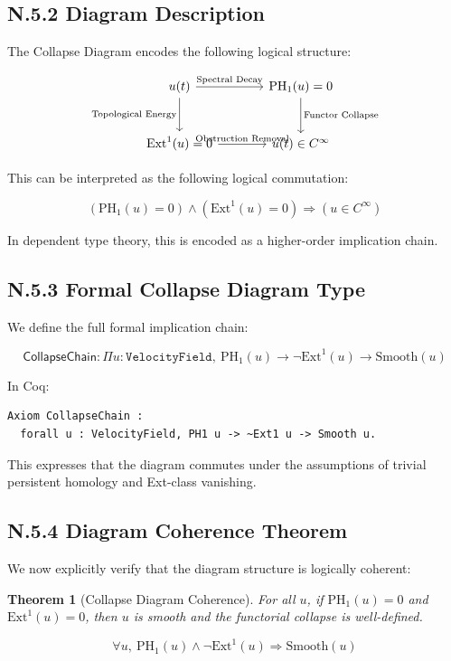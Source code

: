 \documentclass[11pt]{article}
\newtheorem{theorem}{Theorem}[section]
\begin{document}
\subsection*{N.5.2 Diagram Description}

The Collapse Diagram encodes the following logical structure:

\[
\begin{tikzcd}[row sep=large, column sep=large]
u(t) \arrow[r, "\text{Spectral Decay}"] \arrow[d, swap, "\text{Topological Energy}"]
& \mathrm{PH}_1(u) = 0 \arrow[d, "\text{Functor Collapse}"] \\
\mathrm{Ext}^1(u) = 0 \arrow[r, "\text{Obstruction Removal}"]
& u(t) \in C^\infty
\end{tikzcd}
\]

This can be interpreted as the following logical commutation:

\[
(\mathrm{PH}_1(u) = 0) \wedge (\mathrm{Ext}^1(u) = 0) \Rightarrow (u \in C^\infty)
\]

In dependent type theory, this is encoded as a higher-order implication chain.

\subsection*{N.5.3 Formal Collapse Diagram Type}

We define the full formal implication chain:

\[
\textsf{CollapseChain} : \Pi u : \texttt{VelocityField},\ 
\mathrm{PH}_1(u) \rightarrow \neg \mathrm{Ext}^1(u) \rightarrow \mathrm{Smooth}(u)
\]

In Coq:

\begin{verbatim}
Axiom CollapseChain :
  forall u : VelocityField, PH1 u -> ~Ext1 u -> Smooth u.
\end{verbatim}

This expresses that the diagram commutes under the assumptions of trivial persistent homology and Ext-class vanishing.

\subsection*{N.5.4 Diagram Coherence Theorem}

We now explicitly verify that the diagram structure is logically coherent:

\begin{theorem}[Collapse Diagram Coherence]
For all $u$, if $\mathrm{PH}_1(u) = 0$ and $\mathrm{Ext}^1(u) = 0$,  
then $u$ is smooth and the functorial collapse is well-defined.

\[
\forall u,\ \mathrm{PH}_1(u) \wedge \neg \mathrm{Ext}^1(u) \Rightarrow \mathrm{Smooth}(u)
\]
\end{theorem}
\end{document}
